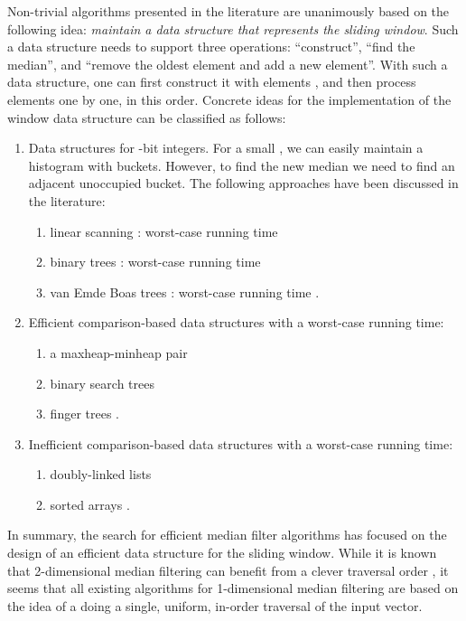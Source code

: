 \documentclass[a4paper,11pt]{article}
\begin{document}
Non-trivial algorithms presented in the literature are unanimously based on the following idea: \emph{maintain a data structure that represents the sliding window}. Such a data structure needs to support three operations: ``construct'', ``find the median'', and ``remove the oldest element and add a new element''. With such a data structure, one can first construct it with elements , and then process elements  one by one, in this order. Concrete ideas for the implementation of the window data structure can be classified as follows:
\begin{enumerate}
    \item Data structures for -bit integers. For a small , we can easily maintain a histogram with  buckets. However, to find the new median we need to find an adjacent unoccupied bucket. The following approaches have been discussed in the literature:
    \begin{enumerate}[noitemsep]
        \item linear scanning \cite{huang79median,ateman80median,juhola91comparison}: worst-case running time 
        \item binary trees \cite{ateman80median,juhola91comparison}: worst-case running time 
        \item van Emde Boas trees \cite{juhola91comparison}: worst-case running time .
    \end{enumerate}
    \item Efficient comparison-based data structures with a  worst-case running time:
    \begin{enumerate}[noitemsep]
        \item a maxheap-minheap pair \cite{astola89median,juhola91comparison,hardle95median-smooth}
        \item binary search trees \cite{juhola91comparison}
        \item finger trees \cite{juhola91comparison}.
    \end{enumerate}
    \item Inefficient comparison-based data structures with a  worst-case running time:
    \begin{enumerate}[noitemsep]
        \item doubly-linked lists \cite{juhola91comparison}
        \item sorted arrays \cite{ahmad87median,juhola91comparison}.
    \end{enumerate}
\end{enumerate}
In summary, the search for efficient median filter algorithms has focused on the design of an efficient data structure for the sliding window. While it is known that 2-dimensional median filtering can benefit from a clever traversal order \cite{perreault07median}, it seems that all existing algorithms for 1-dimensional median filtering are based on the idea of a doing a single, uniform, in-order traversal of the input vector.
\end{document}
